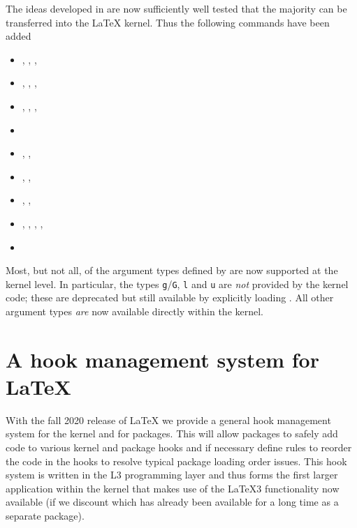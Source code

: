 \documentclass{ltnews}
\begin{document}
The ideas developed in  are now sufficiently well tested
that the majority can be transferred into the \LaTeX{} kernel. Thus
the following commands have been added
\begin{itemize}
  \item {}, ,
    , 
  \item {}, ,
    , 
  \item {}, ,
    , 
  \item {} 
  \item {}, , 
  \item {}, , 
  \item {}, , 
  \item {}, , ,
    , 
  \item {}
\end{itemize}

Most, but not all, of the argument types defined by  are
now supported at the kernel level. In particular, the types
\texttt{g}/\texttt{G}, \texttt{l} and \texttt{u} are \emph{not} provided by
the kernel code; these are deprecated but still available by
explicitly loading . All other argument types \emph{are}
now available directly within the \LaTeXe{} kernel.






\section{A hook management system for \LaTeX{}}

With the fall 2020 release of \LaTeX{} we provide a general hook
management system for the kernel and for packages. This will allow
packages to safely add code to various kernel and package hooks and if
necessary define rules to reorder the code in the hooks to resolve
typical package loading order issues.  This hook system is written in
the L3 programming layer and thus forms the first larger application
within the kernel that makes use of the \LaTeX3 functionality now
available (if we discount  which has already been available for
a long time as a separate package).
\end{document}
